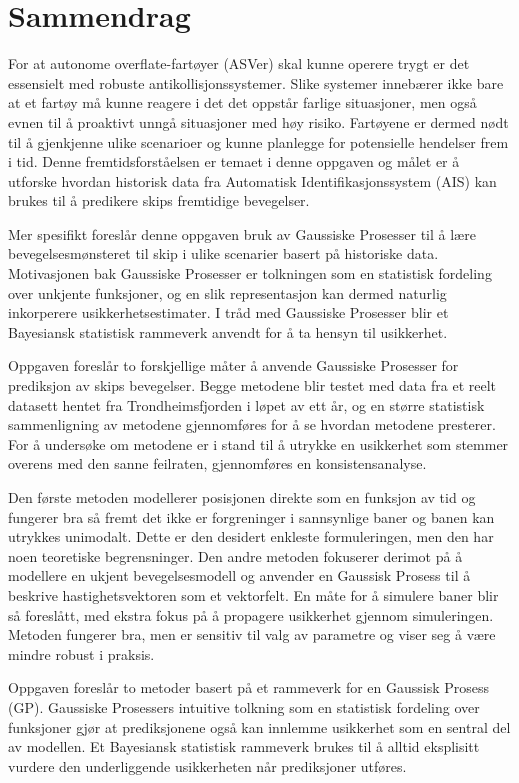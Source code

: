 \chapter*{Sammendrag}
For at autonome overflate-fartøyer (ASVer) skal kunne operere trygt er det essensielt med robuste antikollisjonssystemer. Slike systemer innebærer ikke bare at et fartøy må kunne reagere i det det oppstår farlige situasjoner, men også evnen til å proaktivt unngå situasjoner med høy risiko. Fartøyene er dermed nødt til å gjenkjenne ulike scenarioer og kunne planlegge for potensielle hendelser frem i tid. Denne fremtidsforståelsen er temaet i denne oppgaven og målet er å utforske hvordan historisk data fra Automatisk Identifikasjonssystem (AIS) kan brukes til å predikere skips fremtidige bevegelser.

Mer spesifikt foreslår denne oppgaven bruk av Gaussiske Prosesser til å lære bevegelsesmønsteret til skip i ulike scenarier basert på historiske data. Motivasjonen bak Gaussiske Prosesser er tolkningen som en statistisk fordeling over unkjente funksjoner, og en slik representasjon kan dermed naturlig inkorperere usikkerhetsestimater. I tråd med Gaussiske Prosesser blir et Bayesiansk statistisk rammeverk anvendt for å ta hensyn til usikkerhet.

Oppgaven foreslår to forskjellige måter å anvende Gaussiske Prosesser for prediksjon av skips bevegelser. Begge metodene blir testet med data fra et reelt datasett hentet fra Trondheimsfjorden i løpet av ett år, og en større statistisk sammenligning av metodene gjennomføres for å se hvordan metodene presterer. For å undersøke om metodene er i stand til å utrykke en usikkerhet som stemmer overens med den sanne feilraten, gjennomføres en konsistensanalyse.

Den første metoden modellerer posisjonen direkte som en funksjon av tid og fungerer bra så fremt det ikke er forgreninger i sannsynlige baner og banen kan utrykkes unimodalt. Dette er den desidert enkleste formuleringen, men den har noen teoretiske begrensninger.
Den andre metoden fokuserer derimot på å modellere en ukjent bevegelsesmodell og anvender en Gaussisk Prosess til å beskrive hastighetsvektoren som et vektorfelt. En måte for å simulere baner blir så foreslått, med ekstra fokus på å propagere usikkerhet gjennom simuleringen. Metoden fungerer bra, men er sensitiv til valg av parametre og viser seg å være mindre robust i praksis. 



Oppgaven foreslår to metoder basert på et rammeverk for en Gaussisk Prosess (GP). Gaussiske Prosessers intuitive tolkning som en statistisk fordeling over funksjoner gjør at prediksjonene også kan innlemme usikkerhet som en sentral del av modellen. Et Bayesiansk statistisk rammeverk brukes til å alltid eksplisitt vurdere den underliggende usikkerheten når prediksjoner utføres.

